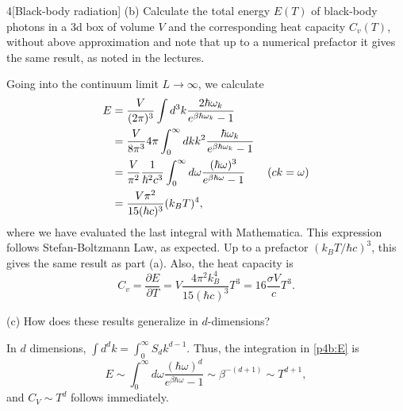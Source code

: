 \documentclass[12pt]{article}
\begin{document}
\begin{problem}{4}[Black-body radiation]
(b) Calculate the total energy $E(T)$ of black-body photons in a 3d box of
volume $V$ and the corresponding heat capacity $C_v(T)$, without above
approximation and note that up to a numerical prefactor it gives the same
result, as noted in the lectures.
\begin{solution}
 Going into the continuum limit $L\to\infty$, we calculate
 \begin{align}
     E&=\frac{V}{(2\pi)^3}\int
    d^3k\frac{2\hbar\omega_k}{e^{\beta\hbar\omega_k}-1}\notag\\
      &=\frac{V}{8\pi^3}4\pi\int_0^\infty dk
      k^2\frac{\hbar\omega_k}{e^{\beta\hbar\omega_k}-1}\notag\\
      &=\frac{V}{\pi^2}\frac1{\hbar^2c^3}\int_0^\infty
      d\omega\frac{(\hbar\omega)^3}{e^{\beta\hbar\omega}-1}\tag{$ck=\omega$}\\
      &=\frac{V\pi^2}{15(\hbar c)^3}(k_BT)^4\label{p4b:E},
 \end{align}
 where we have evaluated the last integral with Mathematica. This expression
 follows Stefan-Boltzmann Law, as expected. Up to a prefactor $(k_BT/\hbar
 c)^3$, this gives the same result as part (a). Also, the heat capacity is
 \begin{equation}
    C_v=\frac{\partial E}{\partial T}
    =V\frac{4\pi^2k_B^4}{15(\hbar c)^3}T^3=16\frac{\sigma V}{c}T^3.
 \end{equation}
\end{solution}

(c) How does these results generalize in $d$-dimensions?
\begin{solution}
In $d$ dimensions, $\int d^dk=\int_0^\infty S_d k^{d-1}$. Thus, the
integration in \eqref{p4b:E} is
\begin{equation}
    E\sim\int_0^\infty d\omega \frac{(\hbar\omega)^d}{e^{\beta\hbar\omega}-1}
    \sim\beta^{-(d+1)}\sim T^{d+1}, 
\end{equation}
and $C_V\sim T^d$ follows immediately.
\end{solution}


\end{problem}
\end{document}

